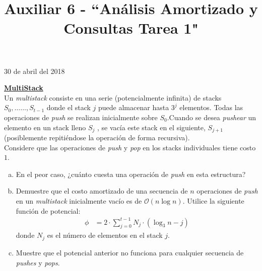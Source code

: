 \documentclass[dcc,uchile]{fcfmcourse}
\title{Auxiliar 6 - ``Análisis Amortizado y Consultas Tarea 1"}
\theoremstyle{plain}
\theoremstyle{definition}
\begin{document}
\maketitle
\begin{center}
30 de abril del 2018
\end{center}


\vspace{-1ex}


\begin{problems}

\problem \underline{\textbf{MultiStack}}\\
Un \textit{multistack} consiste en una serie (potencialmente infinita) de stacks $S_0, \ldots..., S_{t−1}$ donde el stack $j$ puede almacenar hasta $3^j$ elementos. Todas las operaciones de \textit{push} se realizan inicialmente sobre $S_0$.Cuando se desea \textit{pushear} un elemento en un stack lleno $S_j$ , se vacía este stack en el siguiente, $S_{j+1}$ (posiblemente repitiéndose la operación de forma recursiva).\\
Considere que las operaciones de \textit{push} y \textit{pop} en los stacks individuales tiene costo $1$.

\begin{enumerate}[a)]
    \item En el peor caso, ¿cuánto cuesta una operación de \textit{push} en esta estructura?
    \item Demuestre que el costo amortizado de una secuencia de $n$ operaciones de \textit{push} en un \textit{multistack} inicialmente vacío es de $\mathcal{O}(n \log{n})$. Utilice la siguiente función de potencial:
    \begin{align*}
        \phi &= 2\cdot \sum_{j=0}^{t-1} N_j \cdot (\log_3{n} − j)        
    \end{align*}
    donde $N_j$ es el número de elementos en el stack $j$.
    \item Muestre que el potencial anterior no funciona para cualquier secuencia de \textit{pushes} y \textit{pops}.
\end{enumerate}
\end{problems}
\end{document}
